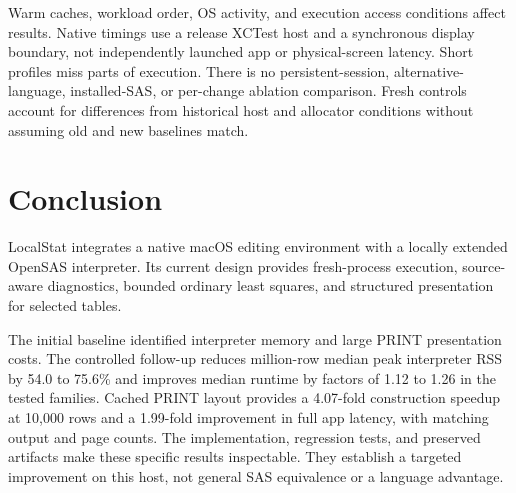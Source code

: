 \documentclass[11pt,a4paper]{article}
\begin{document}
Warm caches, workload order, OS activity, and execution access
conditions affect results. Native timings use a release XCTest
host and a synchronous display boundary, not independently
launched app or physical-screen latency. Short profiles miss
parts of execution. There is no persistent-session, alternative-
language, installed-SAS, or per-change ablation comparison.
Fresh controls account for differences from historical host and
allocator conditions without assuming old and new baselines match.

\section{Conclusion}

LocalStat integrates a native macOS editing environment with
a locally extended OpenSAS interpreter. Its current design
provides fresh-process execution, source-aware diagnostics,
bounded ordinary least squares, and structured presentation
for selected tables.

The initial baseline identified interpreter memory and large
PRINT presentation costs. The controlled follow-up reduces
million-row median peak interpreter RSS by 54.0 to 75.6\% and
improves median runtime by factors of 1.12 to 1.26 in the tested
families. Cached PRINT layout provides a 4.07-fold construction
speedup at 10,000 rows and a 1.99-fold improvement in full app
latency, with matching output and page counts. The implementation,
regression tests, and preserved artifacts make these specific
results inspectable. They establish a targeted improvement on
this host, not general SAS equivalence or a language advantage.
\end{document}
